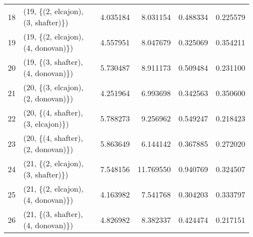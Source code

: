 \begin{tabular}{llrrrr}
18 &  (19, \{(2, elcajon), (3, shafter)\}) &   4.035184 &   8.031154 &   0.488334 &  0.225579 \\
19 &  (19, \{(2, elcajon), (4, donovan)\}) &   4.557951 &   8.047679 &   0.325069 &  0.354211 \\
20 &  (19, \{(3, shafter), (4, donovan)\}) &   5.730487 &   8.911173 &   0.509484 &  0.231100 \\
21 &  (20, \{(3, elcajon), (2, donovan)\}) &   4.251964 &   6.993698 &   0.342563 &  0.350600 \\
22 &  (20, \{(4, shafter), (3, elcajon)\}) &   5.788273 &   9.256962 &   0.549247 &  0.218423 \\
23 &  (20, \{(4, shafter), (2, donovan)\}) &   5.863649 &   6.144142 &   0.367885 &  0.272020 \\
24 &  (21, \{(2, elcajon), (3, shafter)\}) &   7.548156 &  11.769550 &   0.940769 &  0.324507 \\
25 &  (21, \{(2, elcajon), (4, donovan)\}) &   4.163982 &   7.541768 &   0.304203 &  0.333797 \\
26 &  (21, \{(3, shafter), (4, donovan)\}) &   4.826982 &   8.382337 &   0.424474 &  0.217151 \\
\bottomrule
\end{tabular}
